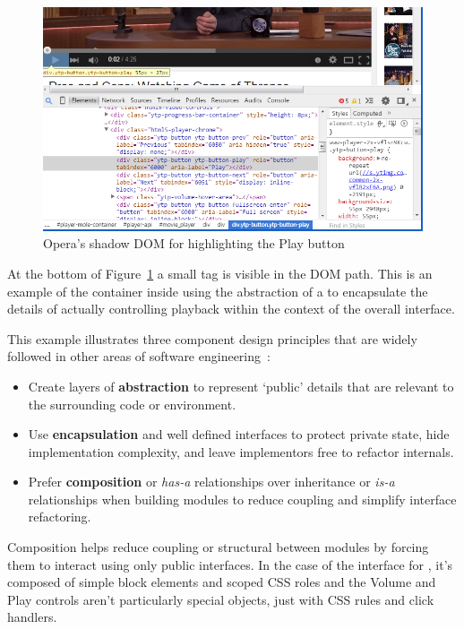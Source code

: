 \begin{figure}[htb]
\centering
 \includegraphics[width=5.5in]{images/html5_video_control.png}
\caption{Opera's shadow DOM for  highlighting the Play button}
\label{f:html5video}
\end{figure}

At the bottom of Figure~\ref{f:html5video} a small  tag is visible in the DOM path.
This is an example of the container inside  using the abstraction of a  to encapsulate the details of actually controlling playback within the context of the overall  interface.

This example illustrates three component design principles that are widely followed in other areas of software engineering~\cite{fowler2012}:
\begin{itemize}
\item Create layers of \textbf{abstraction} to represent `public' details that are relevant to the surrounding code or environment.
\item Use \textbf{encapsulation} and well defined interfaces to protect private state, hide implementation complexity, and leave implementors free to refactor internals.
\item Prefer \textbf{composition} or \textit{has-a} relationships over inheritance or \textit{is-a} relationships when building modules to reduce coupling and simplify interface refactoring.
\end{itemize}

Composition helps reduce coupling or structural between modules by forcing them to interact using only public interfaces.
In the case of the interface for , it's composed of simple block elements and scoped CSS roles and the Volume and Play controls aren't particularly special objects, just  with CSS rules and click handlers.

